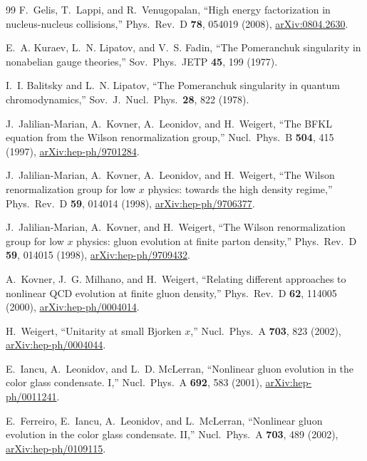 \documentclass[aps,prd,onecolumn,superscriptaddress,nofootinbib,floatfix,longbibliography,11pt]{revtex4-2}
\numberwithin{equation}{section}
\begin{document}
\begin{thebibliography}{99}
F.~Gelis, T.~Lappi, and R.~Venugopalan, ``High energy factorization in nucleus-nucleus collisions,'' Phys.\ Rev.\ D \textbf{78}, 054019 (2008), \href{https://arxiv.org/abs/0804.2630}{arXiv:0804.2630}.

E.~A. Kuraev, L.~N. Lipatov, and V.~S. Fadin, ``The Pomeranchuk singularity in nonabelian gauge theories,'' Sov.\ Phys.\ JETP \textbf{45}, 199 (1977).

I.~I. Balitsky and L.~N. Lipatov, ``The Pomeranchuk singularity in quantum chromodynamics,'' Sov.\ J.\ Nucl.\ Phys.\ \textbf{28}, 822 (1978).

J.~Jalilian-Marian, A.~Kovner, A.~Leonidov, and H.~Weigert, ``The BFKL equation from the Wilson renormalization group,'' Nucl.\ Phys.\ B \textbf{504}, 415 (1997), \href{https://arxiv.org/abs/hep-ph/9701284}{arXiv:hep-ph/9701284}.

J.~Jalilian-Marian, A.~Kovner, A.~Leonidov, and H.~Weigert, ``The Wilson renormalization group for low $x$ physics: towards the high density regime,'' Phys.\ Rev.\ D \textbf{59}, 014014 (1998), \href{https://arxiv.org/abs/hep-ph/9706377}{arXiv:hep-ph/9706377}.

J.~Jalilian-Marian, A.~Kovner, and H.~Weigert, ``The Wilson renormalization group for low $x$ physics: gluon evolution at finite parton density,'' Phys.\ Rev.\ D \textbf{59}, 014015 (1998), \href{https://arxiv.org/abs/hep-ph/9709432}{arXiv:hep-ph/9709432}.

A.~Kovner, J.~G. Milhano, and H.~Weigert, ``Relating different approaches to nonlinear QCD evolution at finite gluon density,'' Phys.\ Rev.\ D \textbf{62}, 114005 (2000), \href{https://arxiv.org/abs/hep-ph/0004014}{arXiv:hep-ph/0004014}.

H.~Weigert, ``Unitarity at small Bjorken $x$,'' Nucl.\ Phys.\ A \textbf{703}, 823 (2002), \href{https://arxiv.org/abs/hep-ph/0004044}{arXiv:hep-ph/0004044}.

E.~Iancu, A.~Leonidov, and L.~D. McLerran, ``Nonlinear gluon evolution in the color glass condensate. I,'' Nucl.\ Phys.\ A \textbf{692}, 583 (2001), \href{https://arxiv.org/abs/hep-ph/0011241}{arXiv:hep-ph/0011241}.

E.~Ferreiro, E.~Iancu, A.~Leonidov, and L.~McLerran, ``Nonlinear gluon evolution in the color glass condensate. II,'' Nucl.\ Phys.\ A \textbf{703}, 489 (2002), \href{https://arxiv.org/abs/hep-ph/0109115}{arXiv:hep-ph/0109115}.


\end{thebibliography}
\end{document}
